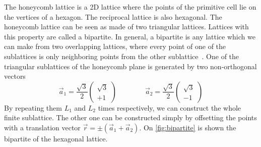 The honeycomb lattice is a 2D lattice where the points of the primitive cell lie on the vertices of a hexagon. The reciprocal lattice is also hexagonal. The honeycomb lattice can be seen as made of two triangular lattices. Lattices with this property are called a bipartite. In general, a bipartite is any lattice which we can make from two overlapping lattices, where every point of one of the sublattices is only neighboring points from the other sublattice~\cite{graphhmc}. One of the triangular sublattices of the honeycomb plane is generated by two non-orthogonal vectors
\begin{equation}
  \vec{a}_1 = \frac{\sqrt{3}}{2}
  \begin{pmatrix}
    \sqrt{3} \\
    +1
  \end{pmatrix} \qquad \qquad
  \vec{a}_2 = \frac{\sqrt{3}}{2}
  \begin{pmatrix}
    \sqrt{3} \\
    -1
  \end{pmatrix}
\end{equation}
By repeating them $L_1$ and $L_2$ times respectively, we can construct the whole finite sublattice. The other one can be constructed simply by offsetting the points with a translation vector $\vec{r} = \pm(\vec{a}_1 + \vec{a}_2)$. On \cref{fig:bipartite} is shown the bipartite of the hexagonal lattice.
